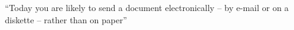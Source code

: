 \documentclass{article}
\begin{document}
    ``Today you are likely to send a document electronically -- by e-mail or on a diskette -- rather than on paper'' \cite{latex}

    
    
\end{document}
